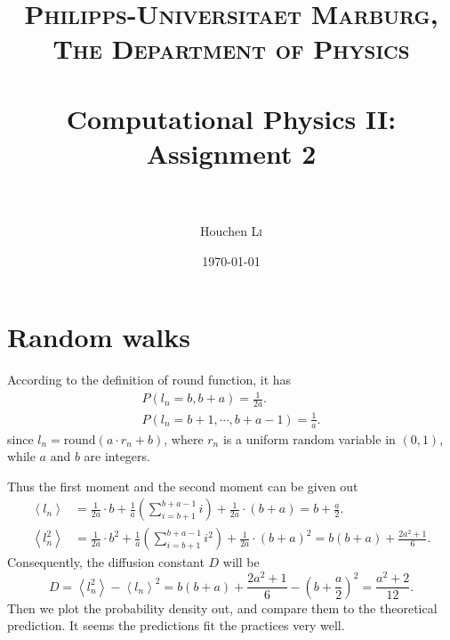 \documentclass[paper=a4, fontsize=11pt]{scrartcl} %
\title{	
	\normalfont \normalsize 
	\textsc{Philipps-Universitaet Marburg, The Department of Physics} \\ [25pt] %
	\horrule{0.5pt} \\[0.4cm] %
	\huge Computational Physics II: Assignment 2 \\ %
	\horrule{2pt} \\[0.5cm] %
}
\author{Houchen \textsc{Li}} %
\date{\normalsize\today} %
\numberwithin{equation}{section} %
\numberwithin{figure}{section} %
\numberwithin{table}{section} %
\begin{document}
\maketitle %


\section{Random walks}

According to the definition of round function, it has
\begin{gather*}
	P\left( l_n=b,b+a \right)=\frac{1}{2a}.\\
	P\left( l_n=b+1,\cdots,b+a-1 \right)=\frac{1}{a}.
\end{gather*}
since \(l_n=\text{round}\left( a\cdot r_n+b \right)\), where \(r_n\) is a uniform random variable in \( \left( 0,1 \right)\), while \(a\) and \(b\) are integers.\par
Thus the first moment and the second moment can be given out
\begin{align*}
	\left<l_n\right>&=\frac{1}{2a}\cdot b+\frac{1}{a}\left(\sum_{i=b+1}^{b+a-1}i\right)+\frac{1}{2a}\cdot \left(b+a\right)=b+\frac{a}{2}.\\
	\left<l_n^2\right>&=\frac{1}{2a}\cdot b^2+\frac{1}{a}\left(\sum_{i=b+1}^{b+a-1}i^2\right)+\frac{1}{2a}\cdot \left(b+a\right)^2=b\left( b+a \right)+\frac{2a^2+1}{6}.
\end{align*}
Consequently, the diffusion constant \(D\) will be
\begin{equation*}
	D=\left<l_n^2\right>-\left<l_n\right>^2=b\left( b+a \right)+\frac{2a^2+1}{6}-\left( b+\frac{a}{2} \right)^2=\frac{a^2+2}{12}.
\end{equation*}
Then we plot the probability density out, and compare them to the theoretical prediction. It seems the predictions fit the practices very well.\par
\end{document}
